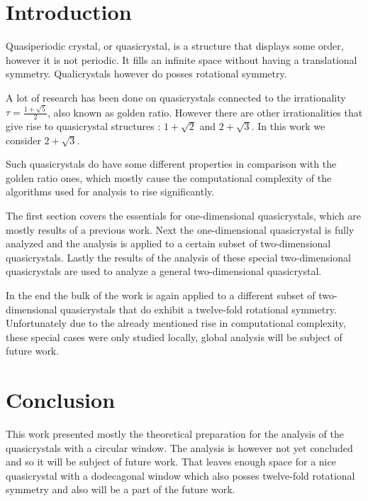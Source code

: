 \documentclass[a4paper,10pt,twoside]{article}
\theoremstyle{definition}
\theoremstyle{remark}
\begin{document}
\section*{Introduction}
Quasiperiodic crystal, or quasicrystal, is a structure that displays some order, however it is not periodic. It fills an infinite space without having a translational symmetry. Qualicrystals however do posses rotational symmetry. 

A lot of research \cite{classification,classificationII,classificationIII} has been done on quasicrystals connected to the irrationality $\tau = \frac{1+\sqrt{5}}{2}$, also known as golden ratio. However there are other irrationalities that give rise to quasicrystal structures \cite{gazeau}: $1+\sqrt{2}$ and $2+\sqrt{3}$. In this work we consider $2+\sqrt{3}$.

Such quasicrystals do have some different properties in comparison with the golden ratio ones, which mostly cause the computational complexity of the algorithms used for analysis to rise significantly. 

The first section covers the essentials for one-dimensional quasicrystals, which are mostly results of a previous work. Next the one-dimensional quasicrystal is fully analyzed and the analysis is applied to a certain subset of two-dimensional quasicrystals. Lastly the results of the analysis of these special two-dimensional quasicrystals are used to analyze a general two-dimensional quasicrystal. 

In the end the bulk of the work is again applied to a different subset of two-dimensional quasicrystals that do exhibit a twelve-fold rotational symmetry. Unfortunately due to the already mentioned rise in computational complexity, these special cases were only studied locally, global analysis will be subject of future work. 
\cleardoublepage
\pagestyle{plain}






\cleardoublepage






\clearpage
\pagestyle{empty}
\section*{Conclusion}
This work presented mostly the theoretical preparation for the analysis of the quasicrystals with a circular window. The analysis is however not yet concluded and so it will be subject of future work. That leaves enough space for a nice quasicrystal with a dodecagonal window which also posses twelve-fold rotational symmetry and also will be a part of the future work. 
\end{document}
